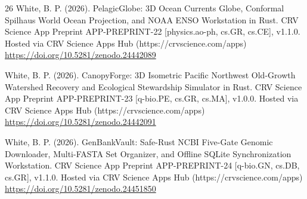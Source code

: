 \documentclass[10pt,letterpaper]{article}
\begin{document}
\begin{thebibliography}{26}
 White, B. P. (2026). PelagicGlobe: 3D Ocean Currents Globe, Conformal Spilhaus World Ocean Projection, and NOAA ENSO Workstation in Rust. CRV Science App Preprint APP-PREPRINT-22 [physics.ao-ph, cs.GR, cs.CE], v1.1.0. Hosted via CRV Science Apps Hub (https://crvscience.com/apps) \url{https://doi.org/10.5281/zenodo.24442089}

 White, B. P. (2026). CanopyForge: 3D Isometric Pacific Northwest Old-Growth Watershed Recovery and Ecological Stewardship Simulator in Rust. CRV Science App Preprint APP-PREPRINT-23 [q-bio.PE, cs.GR, cs.MA], v1.0.0. Hosted via CRV Science Apps Hub (https://crvscience.com/apps) \url{https://doi.org/10.5281/zenodo.24442091}

 White, B. P. (2026). GenBankVault: Safe-Rust NCBI Five-Gate Genomic Downloader, Multi-FASTA Set Organizer, and Offline SQLite Synchronization Workstation. CRV Science App Preprint APP-PREPRINT-24 [q-bio.GN, cs.DB, cs.GR], v1.1.0. Hosted via CRV Science Apps Hub (https://crvscience.com/apps) \url{https://doi.org/10.5281/zenodo.24451850}
\end{thebibliography}
\end{document}
